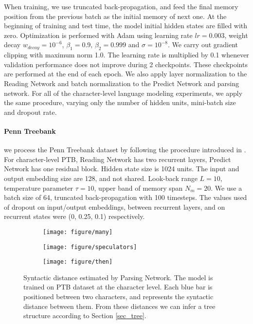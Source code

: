 \documentclass{article} \usepackage{iclr2018_conference,times}
\begin{document}
When training, we use truncated back-propagation, and feed the final memory position from the previous batch as the initial memory of next one. At the beginning of training and test time, the model initial hidden states are filled with zero. Optimization is performed with Adam using learning rate $lr = 0.003$, weight decay $w_{decay} = 10^{-6}$, $\beta_1 = 0.9$, $\beta_2 = 0.999$ and $\sigma = 10^{-8}$. We carry out gradient clipping with maximum norm 1.0.	 The learning rate is multiplied by 0.1 whenever validation performance does not improve during 2 checkpoints. These checkpoints are performed at the end of each epoch. We also apply layer normalization \citep{ba2016layer} to the Reading Network and batch normalization to the Predict Network and parsing network. For all of the character-level language modeling experiments, we apply the same procedure, varying only the number of hidden units, mini-batch size and dropout rate. 

\paragraph{Penn Treebank} we process the Penn Treebank dataset \citep{marcus1993building} by following the procedure introduced in \citep{mikolov2012subword}. For character-level PTB, Reading Network has two recurrent layers, Predict Network has one residual block. Hidden state size is 1024 units. The input and output embedding size are 128, and not shared. Look-back range $L=10$, temperature parameter $\tau = 10$, upper band of memory span $N_m=20$. We use a batch size of 64, truncated back-propagation with 100 timesteps. The values used of dropout on input/output embeddings, between recurrent layers, and on recurrent states were (0, 0.25, 0.1) respectively.

\begin{figure*}
    \centering
    \setlength{\leftskip}{-110pt}
    \begin{subfigure}[b]{1.5\textwidth}
        \texttt{[image: figure/many]}
    \end{subfigure}
    \begin{subfigure}[b]{1.5\textwidth}
        \texttt{[image: figure/speculators]}
    \end{subfigure}
    \begin{subfigure}[b]{1.5\textwidth}
        \texttt{[image: figure/then]}
    \end{subfigure}
    \caption{Syntactic distance estimated by Parsing Network. The model is trained on PTB dataset at the character level. Each blue bar is positioned between two characters, and represents the syntactic distance between them. From these distances we can infer a tree structure according to Section \ref{sec_tree}. }
    \label{fig_char}
\end{figure*}
\end{document}
